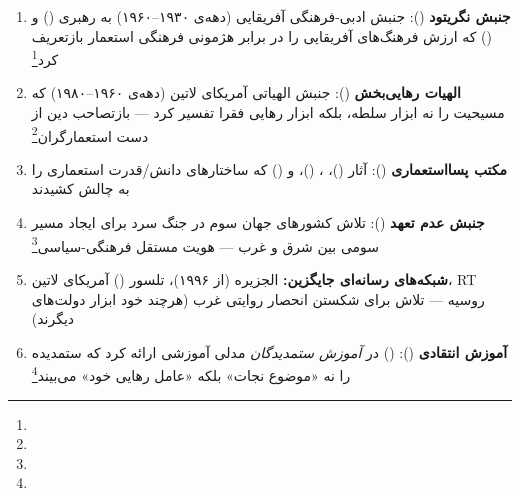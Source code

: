 \begin{tcolorbox}[successbox, title={نمونه‌های مقاومت فرهنگی در برابر تسهیل‌گری مداخله}]
\begin{enumerate}
\item \textbf{جنبش نگریتود} (): جنبش ادبی-فرهنگی آفریقایی (دهه‌ی ۱۹۳۰–۱۹۶۰) به رهبری  () و  () که ارزش فرهنگ‌های آفریقایی را در برابر هژمونی فرهنگی استعمار بازتعریف کرد\footnote{}

\item \textbf{الهیات رهایی‌بخش} (): جنبش الهیاتی آمریکای لاتین (دهه‌ی ۱۹۶۰–۱۹۸۰) که مسیحیت را نه ابزار سلطه، بلکه ابزار رهایی فقرا تفسیر کرد — بازتصاحب دین از دست استعمارگران\footnote{}

\item \textbf{مکتب پسااستعماری} (): آثار  ()، ،  ()، و  () که ساختارهای دانش/قدرت استعماری را به چالش کشیدند

\item \textbf{جنبش عدم تعهد} (): تلاش کشورهای جهان سوم در جنگ سرد برای ایجاد مسیر سومی بین شرق و غرب — هویت مستقل فرهنگی-سیاسی\footnote{}

\item \textbf{شبکه‌های رسانه‌ای جایگزین:} الجزیره (از ۱۹۹۶)، تلسور () آمریکای لاتین، RT روسیه — تلاش برای شکستن انحصار روایتی غرب (هرچند خود ابزار دولت‌های دیگرند)

\item \textbf{آموزش انتقادی} ():  () در \textit{آموزش ستمدیدگان} مدلی آموزشی ارائه کرد که ستمدیده را نه «موضوع نجات» بلکه «عامل رهایی خود» می‌بیند\footnote{}
\end{enumerate}
\end{tcolorbox}


